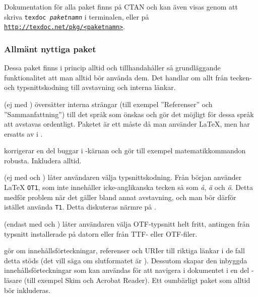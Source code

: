 \documentclass[lang=sv,ptsize=10pt,font=none,nomath,titles=bf,../../a4.tex]{subfiles}
\begin{document}
Dokumentation för alla paket finns på CTAN och kan
även visas genom att skriva \texttt{texdoc \emph{paketnamn}} i terminalen,
eller på
\href{http://texdoc.net}{\nolinkurl{http://texdoc.net/pkg/<paketnamn>}}.

\subsubsection{Allmänt nyttiga paket}
Dessa paket finns i princip alltid och tillhandahåller så grundläggande
funktionalitet att man alltid bör använda dem. Det handlar om allt från
tecken- och typsnittskodning till avstavning och interna länkar.

\begin{description}
	\item[\pack{babel}] (ej med \XeTeX)
	översätter interna strängar (till exempel ”Referenser” och 
	”Sammanfattning”) till det språk som önskas och gör det möjligt för
	dessa språk att avstavas ordentligt. Paketet är ett måste då man
	använder \LaTeX, men har ersatts av  i \XeTeX.
	
	\item[\pack{fixltx2e}]
	korrigerar en del buggar i \LaTeXe-kärnan och gör till 
	exempel matematikkommandon robusta. Inkludera alltid.
	
	\item[\pack{fontenc}] (ej med \XeTeX och )
	låter användaren välja typsnittskodning. Från början använder \LaTeX{}
	\texttt{OT1}, som inte innehåller icke-anglikanska tecken så som
	\emph{å}, \emph{ä} och \emph{ö}. Detta medför problem när det gäller
	bland annat avstavning, och man bör därför istället använda 
	\texttt{T1}. Detta diskuteras närmre på .

	\item[\pack{fontspec}] (endast med \XeTeX och )
	låter användaren välja \textsc{OTF}-typsnitt helt fritt, antingen
	från typsnitt installerade på datorn eller från \textsc{TTF}- eller
	\textsc{OTF}-filer.
	
	\item[\pack{hyperref}]
	gör om innehållsförteckningar, referenser och URIer till riktiga
	länkar i de fall detta stöds (det vill säga om slutformatet är \PDF).
	Dessutom skapar den inbyggda innehållsförteckningar som kan användas
	för att navigera i dokumentet i en del \PDF-läsare (till exempel Skim
	och Acrobat Reader).
	Ett oumbärligt paket som alltid bör inkluderas.
	

\end{description}
\end{document}
